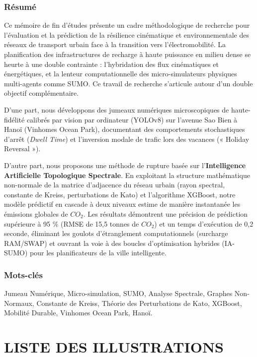 \documentclass[11pt, a4paper]{article}
\begin{document}
\subsubsection{Résumé}\label{ruxe9sumuxe9}

Ce mémoire de fin d'études présente un cadre méthodologique de recherche
pour l'évaluation et la prédiction de la résilience cinématique et
environnementale des réseaux de transport urbain face à la transition
vers l'électromobilité. La planification des infrastructures de recharge
à haute puissance en milieu dense se heurte à une double contrainte :
l'hybridation des flux cinématiques et énergétiques, et la lenteur
computationnelle des micro-simulateurs physiques multi-agents comme
SUMO. Ce travail de recherche s'articule autour d'un double objectif
complémentaire.

D'une part, nous développons des jumeaux numériques microscopiques de
haute-fidélité calibrés par vision par ordinateur (YOLOv8) sur l'avenue
Sao Bien à Hanoï (Vinhomes Ocean Park), documentant des comportements
stochastiques d'arrêt (\emph{Dwell Time}) et l'inversion modale de
trafic lors des vacances (« Holiday Reversal »).

D'autre part, nous proposons une méthode de rupture basée sur
l'\textbf{Intelligence Artificielle Topologique Spectrale}. En
exploitant la structure mathématique non-normale de la matrice
d'adjacence du réseau urbain (rayon spectral, constante de Kreiss,
perturbations de Kato) et l'algorithme XGBoost, notre modèle prédictif
en cascade à deux niveaux estime de manière instantanée les émissions
globales de \(CO_2\). Les résultats démontrent une précision de
prédiction supérieure à 95 \% (RMSE de 15,5 tonnes de \(CO_2\)) et un
temps d'exécution de 0,2 seconde, éliminant les goulots d'étranglement
computationnels (surcharge RAM/SWAP) et ouvrant la voie à des boucles
d'optimisation hybrides (IA-SUMO) pour les planificateurs de la ville
intelligente.

\subsubsection{Mots-clés}\label{mots-cluxe9s}

Jumeau Numérique, Micro-simulation, SUMO, Analyse Spectrale, Graphes
Non-Normaux, Constante de Kreiss, Théorie des Perturbations de Kato,
XGBoost, Mobilité Durable, Vinhomes Ocean Park, Hanoï.

\newpage

\section{LISTE DES ILLUSTRATIONS}\label{liste-des-illustrations}
\end{document}
